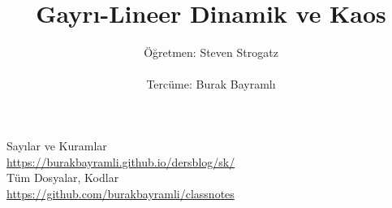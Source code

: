 \documentclass[12pt,a4paper]{report}
\title{Gayrı-Lineer Dinamik ve Kaos}
\author{Öğretmen: Steven Strogatz \\ \\  Tercüme: Burak Bayramlı}
\date{}
\begin{document}
\maketitle

\newpage

\begin{figure}[!hbp]
\end{figure}


\vspace*{4cm}
\begin{center}
\vspace{0.5cm}
Sayılar ve Kuramlar\\
\vspace{0.5cm}
\url{https://burakbayramli.github.io/dersblog/sk/}\\
\vspace{0.5cm}
Tüm Dosyalar, Kodlar\\
\vspace{0.5cm}
\url{https://github.com/burakbayramli/classnotes}\\
\end{center}
\end{document}

